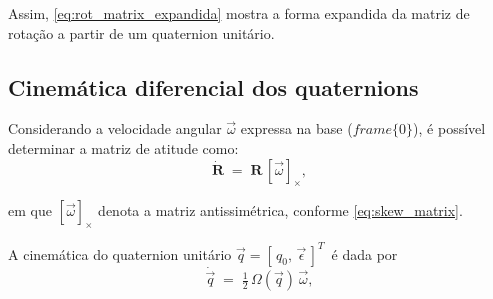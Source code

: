 Assim, \eqref{eq:rot_matrix_expandida} mostra a forma expandida da matriz de rotação a partir de um quaternion unitário.




\subsection{Cinemática diferencial dos quaternions}
\label{sec:cinematica_diferencial_quaternions}

Considerando a velocidade angular $\vec \omega$ expressa na base ($frame \{0\}$), é possível determinar a matriz de atitude como:
\begin{equation}
    \dot{\mathbf{R}} \;=\; \mathbf{R}\,[\vec{\omega}]_{\times},
    \label{eq:dotR_base}
\end{equation}

em que $[\vec{\omega}]_{\times}$ denota a matriz antissimétrica, conforme \eqref{eq:skew_matrix}.

A cinemática do quaternion unitário
$\vec{q}=[\,q_{0},\,\vec{\epsilon}\,]^{T}\,$
é dada por
\begin{equation}
\label{eq:definicao_qdot}
\dot{\vec{q}} \;=\; \tfrac{1}{2}\,\Omega(\vec{q})\,\vec{\omega},
\end{equation}

